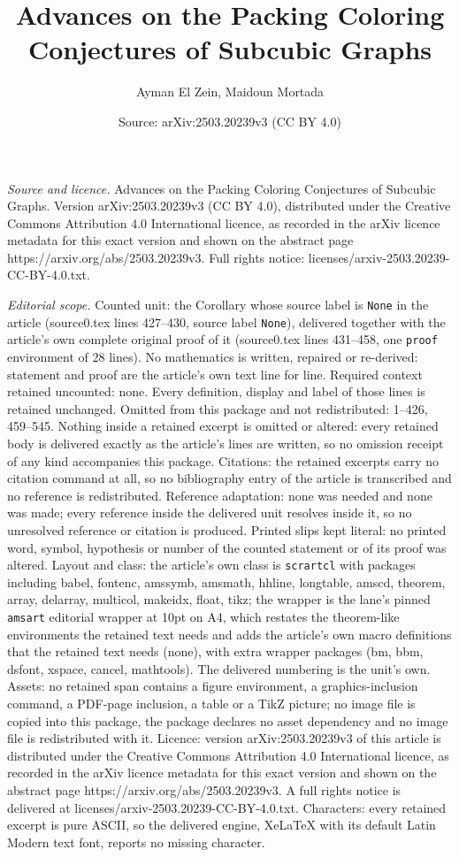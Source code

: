 \documentclass[10pt,a4paper]{amsart}
\title[Advances on the Packing Coloring Conjectures of Subcubic Gra]{Advances on the Packing Coloring Conjectures of Subcubic Graphs}
\author{Ayman El Zein, Maidoun Mortada}
\date{Source: arXiv:2503.20239v3 (CC BY 4.0)}
\begin{document}
\maketitle

\noindent\emph{Source and licence.} Advances on the Packing Coloring Conjectures of Subcubic Graphs. Version arXiv:2503.20239v3 (CC BY 4.0), distributed under the Creative Commons Attribution 4.0 International licence, as recorded in the arXiv licence metadata for this exact version and shown on the abstract page https://arxiv.org/abs/2503.20239v3. Full rights notice: licenses/arxiv-2503.20239-CC-BY-4.0.txt.\par\smallskip

\noindent\textit{Editorial scope.} Counted unit: the Corollary whose source label is \texttt{None} in the article (source0.tex lines 427--430, source label \texttt{None}), delivered together with the article's own complete original proof of it (source0.tex lines 431--458, one \texttt{proof} environment of 28 lines). No mathematics is written, repaired or re-derived: statement and proof are the article's own text line for line. Required context retained uncounted: none. Every definition, display and label of those lines is retained unchanged. Omitted from this package and not redistributed: 1--426, 459--545. Nothing inside a retained excerpt is omitted or altered: every retained body is delivered exactly as the article's lines are written, so no omission receipt of any kind accompanies this package. Citations: the retained excerpts carry no citation command at all, so no bibliography entry of the article is transcribed and no reference is redistributed. Reference adaptation: none was needed and none was made; every reference inside the delivered unit resolves inside it, so no unresolved reference or citation is produced. Printed slips kept literal: no printed word, symbol, hypothesis or number of the counted statement or of its proof was altered. Layout and class: the article's own class is \texttt{scrartcl} with packages including babel, fontenc, amssymb, amsmath, hhline, longtable, amscd, theorem, array, delarray, multicol, makeidx, float, tikz; the wrapper is the lane's pinned \texttt{amsart} editorial wrapper at 10pt on A4, which restates the theorem-like environments the retained text needs and adds the article's own macro definitions that the retained text needs (none), with extra wrapper packages (bm, bbm, dsfont, xspace, cancel, mathtools). The delivered numbering is the unit's own. Assets: no retained span contains a figure environment, a graphics-inclusion command, a PDF-page inclusion, a table or a TikZ picture; no image file is copied into this package, the package declares no asset dependency and no image file is redistributed with it. Licence: version arXiv:2503.20239v3 of this article is distributed under the Creative Commons Attribution 4.0 International licence, as recorded in the arXiv licence metadata for this exact version and shown on the abstract page https://arxiv.org/abs/2503.20239v3. A full rights notice is delivered at licenses/arxiv-2503.20239-CC-BY-4.0.txt. Characters: every retained excerpt is pure ASCII, so the delivered engine, XeLaTeX with its default Latin Modern text font, reports no missing character.
\end{document}

